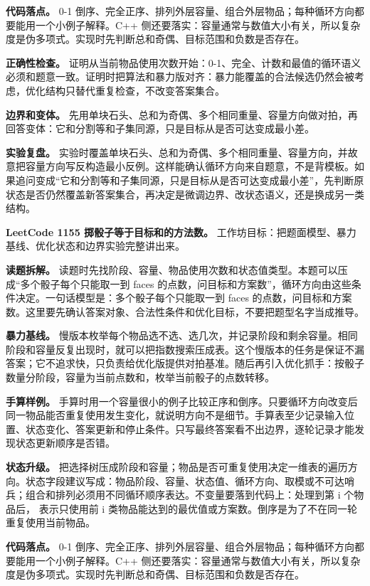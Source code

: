 \textbf{代码落点。} 0-1 倒序、完全正序、排列外层容量、组合外层物品；每种循环方向都要能用一个小例子解释。C++ 侧还要落实：容量通常与数值大小有关，所以复杂度是伪多项式。实现时先判断总和奇偶、目标范围和负数是否存在。

\textbf{正确性检查。} 证明从当前物品使用次数开始：0-1、完全、计数和最值的循环语义必须和题意一致。证明时把算法和暴力版对齐：暴力能覆盖的合法候选仍然会被考虑，优化结构只替代重复检查，不改变答案集合。

\textbf{边界和变体。} 先用单块石头、总和为奇偶、多个相同重量、容量方向做对拍，再回答变体：它和分割等和子集同源，只是目标从是否可达变成最小差。

\textbf{实验复盘。} 实验时覆盖单块石头、总和为奇偶、多个相同重量、容量方向，并故意把容量方向写反构造最小反例。这样能确认循环方向来自题意，不是背模板。如果追问变成“它和分割等和子集同源，只是目标从是否可达变成最小差”，先判断原状态是否仍然覆盖新答案集合，再决定是微调边界、改状态语义，还是换成另一类结构。

\noindent\textbf{LeetCode 1155 掷骰子等于目标和的方法数。} 工作坊目标：把题面模型、暴力基线、优化状态和边界实验完整讲出来。

\textbf{读题拆解。} 读题时先找阶段、容量、物品使用次数和状态值类型。本题可以压成“多个骰子每个只能取一到 faces 的点数，问目标和方案数”，循环方向由这些条件决定。一句话模型是：多个骰子每个只能取一到 faces 的点数，问目标和方案数。这里要先确认答案对象、合法性条件和优化目标，不要把题型名字当成推导。

\textbf{暴力基线。} 慢版本枚举每个物品选不选、选几次，并记录阶段和剩余容量。相同阶段和容量反复出现时，就可以把指数搜索压成表。这个慢版本的任务是保证不漏答案；它不追求快，只负责给优化版提供对拍基准。随后再引入优化抓手：按骰子数量分阶段，容量为当前点数和，枚举当前骰子的点数转移。

\textbf{手算样例。} 手算时用一个容量很小的例子比较正序和倒序。只要循环方向改变后同一物品能否重复使用发生变化，就说明方向不是细节。手算表至少记录输入位置、状态变化、答案更新和停止条件。只写最终答案看不出边界，逐轮记录才能发现状态更新顺序是否错。

\textbf{状态升级。} 把选择树压成阶段和容量；物品是否可重复使用决定一维表的遍历方向。状态字段建议写成：物品阶段、容量、状态值、循环方向、取模或不可达哨兵；组合和排列必须用不同循环顺序表达。不变量要落到代码上：处理到第 i 个物品后， 表示只使用前 i 类物品能达到的最优值或方案数。倒序是为了不在同一轮重复使用当前物品。

\textbf{代码落点。} 0-1 倒序、完全正序、排列外层容量、组合外层物品；每种循环方向都要能用一个小例子解释。C++ 侧还要落实：容量通常与数值大小有关，所以复杂度是伪多项式。实现时先判断总和奇偶、目标范围和负数是否存在。

